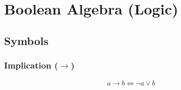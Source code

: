 \section{Boolean Algebra (Logic)}

\subsection{Symbols}

\subsubsection{Implication ($\rightarrow$) }

\begin{equation}
  \begin{array}{c}
    a \rightarrow b \Leftrightarrow \neg a \lor b
  \end{array}
\end{equation}
